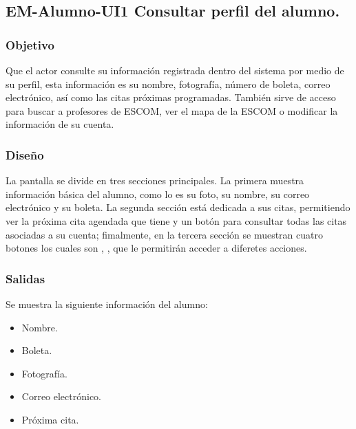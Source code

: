 





\subsection{EM-Alumno-UI1 Consultar perfil del alumno.}

\subsubsection{Objetivo}
	\noindent
	Que el actor consulte su información registrada dentro del sistema por medio de su perfil, esta información es su nombre, fotografía, número de boleta, correo electrónico, así como las citas próximas programadas. También sirve de acceso para buscar a profesores de ESCOM, ver el mapa de la ESCOM o modificar la información de su cuenta. 
	
\subsubsection{Diseño}
	\noindent
	La pantalla se divide en tres secciones principales. La primera muestra información básica del alumno, como lo es su foto, su nombre, su correo electrónico y su boleta. La segunda sección está dedicada a sus citas, permitiendo ver la próxima cita agendada que tiene y un botón para consultar todas las citas asociadas a su cuenta; fimalmente, en la tercera sección se muestran cuatro botones los cuales son , ,  que le permitirán acceder a diferetes acciones. 

\pagebreak
{}

\subsubsection{Salidas}
	\noindent
	Se muestra la siguiente información del alumno:
	\begin{itemize}
		\item Nombre.
		\item Boleta.
		\item Fotografía.
		\item Correo electrónico.
		\item Próxima cita. 
	\end{itemize}

